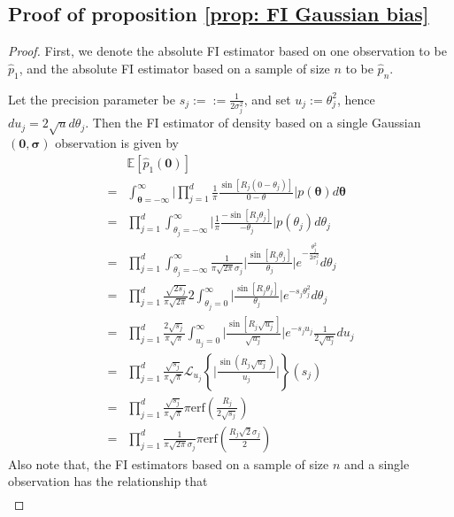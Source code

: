 \documentclass[%
 reprint,
 amsmath,amssymb,
 aps,
]{revtex4-2}
\def\E{\mathbb{E}}
\def\erf{\text{erf}}
\def\btheta{\boldsymbol{\theta}}
\def\btheta{\boldsymbol{\theta}}
\newcommand{\btheta}{\mbox{\boldmath $\theta$}}
\begin{document}
\subsection{Proof of proposition \ref{prop: FI Gaussian bias}}
\begin{proof}
    First, we denote the absolute FI estimator based on one observation to be $\hat{p}_{\text{1}}$, and the absolute FI estimator based on a sample of size $n$ to be $\hat{p}_{n}$.
    
    Let the precision parameter be $s_j := := \frac{1}{2\sigma_j^2}$, and set $u_j := \theta_j^2$, hence $du_j = 2\sqrt{u}d\theta_j$. Then the FI estimator of density based on a single Gaussian$(\mathbf{0},
    \boldsymbol{\sigma})$ observation is given by
    \begin{align*}
        & \E[\hat{p}_{\text{1}}(\mathbf{0})] \\
        = & \int_{\btheta = -\boldsymbol{\infty}}^{\boldsymbol{\infty}}\bigg|\prod_{j = 1}^d \frac{1}{\pi} \frac{\sin[R_j(0 - \theta_j)]}{0 - \theta}\bigg| p(\btheta)d\btheta \\
        = & \prod_{j = 1}^d \int_{\theta_j = -\infty}^\infty\bigg|\frac{1}{\pi} \frac{-\sin[R_j\theta_j]}{ - \theta_j}\bigg| p(\theta_j) d\theta_j \\
        = & \prod_{j = 1}^d \int_{\theta_j = -\infty}^\infty\frac{1}{\pi\sqrt{2\pi}\sigma_j}\bigg| \frac{\sin[R_j\theta_j]}{\theta_j}\bigg| e^{-\frac{\theta_j^2}{2\sigma_j^2}} d\theta_j \\
        = & \prod_{j = 1}^d \frac{\sqrt{2s_j}}{\pi\sqrt{2\pi}}2\int_{\theta_j = 0}^\infty \bigg| \frac{\sin[R_j\theta_j]}{\theta_j}\bigg| e^{-s_j\theta_j^2} d\theta_j \\
        = & \prod_{j = 1}^d \frac{2\sqrt{s_j}}{\pi\sqrt{\pi}}\int_{u_j = 0}^\infty \bigg| \frac{\sin[R_j\sqrt{u_j}]}{\sqrt{u_j}}\bigg| e^{-s_ju_j} \frac{1}{2\sqrt{u_j}}du_j \\
        = & \prod_{j = 1}^d \frac{\sqrt{s_j}}{\pi\sqrt{\pi}} \mathcal{L}_{u_j}\left\{\bigg|\frac{\sin(R_j\sqrt{u_j})}{u_j} \bigg| \right\}(s_j) \\
        = & \prod_{j = 1}^d \frac{\sqrt{s_j}}{\pi\sqrt{\pi}} \pi \erf\left(\frac{R_j}{2\sqrt{s_j}} \right) \\
        = & \prod_{j = 1}^d \frac{1}{\pi\sqrt{2\pi}\sigma_j} \pi \erf\left(\frac{R_j\sqrt{2}\sigma_j}{2} \right)
    \end{align*}
    Also note that, the FI estimators based on a sample of size $n$ and a single observation has the relationship that
    \begin{align*}

\end{align*}
\end{proof}
\end{document}
